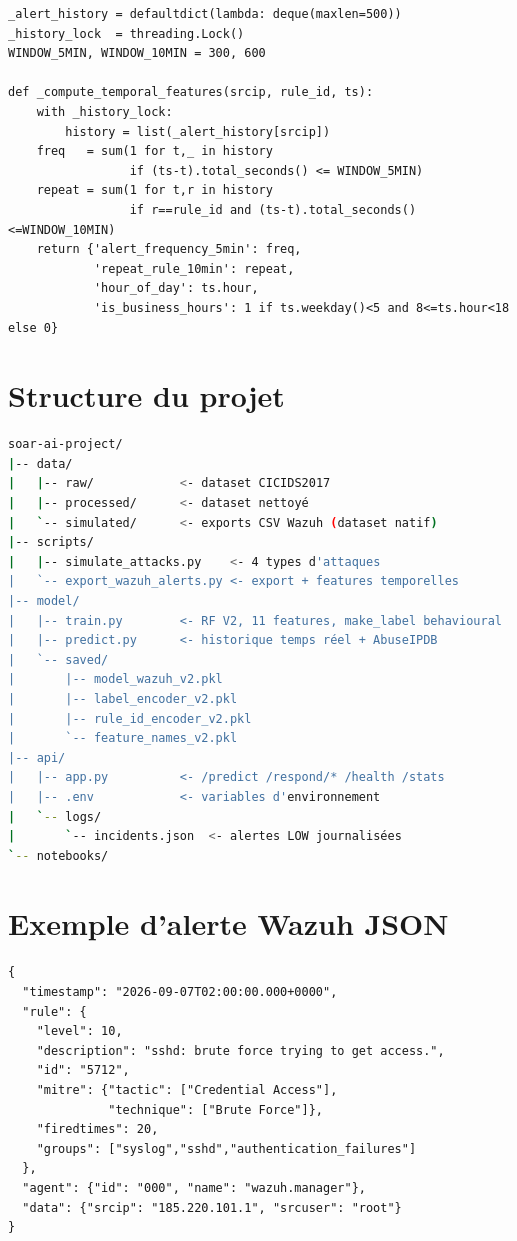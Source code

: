 \documentclass[12pt,a4paper]{report}
\begin{document}
\begin{lstlisting}[style=mycode,
  caption={Historique en mémoire thread-safe (predict.py)}]
_alert_history = defaultdict(lambda: deque(maxlen=500))
_history_lock  = threading.Lock()
WINDOW_5MIN, WINDOW_10MIN = 300, 600

def _compute_temporal_features(srcip, rule_id, ts):
    with _history_lock:
        history = list(_alert_history[srcip])
    freq   = sum(1 for t,_ in history
                 if (ts-t).total_seconds() <= WINDOW_5MIN)
    repeat = sum(1 for t,r in history
                 if r==rule_id and (ts-t).total_seconds()<=WINDOW_10MIN)
    return {'alert_frequency_5min': freq,
            'repeat_rule_10min': repeat,
            'hour_of_day': ts.hour,
            'is_business_hours': 1 if ts.weekday()<5 and 8<=ts.hour<18 else 0}
\end{lstlisting}

\chapter{Structure du projet}
\label{annexe:structure}

\begin{lstlisting}[style=mycode, language=bash,
  caption={Structure du répertoire soar-ai-project}]
soar-ai-project/
|-- data/
|   |-- raw/            <- dataset CICIDS2017
|   |-- processed/      <- dataset nettoyé
|   `-- simulated/      <- exports CSV Wazuh (dataset natif)
|-- scripts/
|   |-- simulate_attacks.py    <- 4 types d'attaques
|   `-- export_wazuh_alerts.py <- export + features temporelles
|-- model/
|   |-- train.py        <- RF V2, 11 features, make_label behavioural
|   |-- predict.py      <- historique temps réel + AbuseIPDB
|   `-- saved/
|       |-- model_wazuh_v2.pkl
|       |-- label_encoder_v2.pkl
|       |-- rule_id_encoder_v2.pkl
|       `-- feature_names_v2.pkl
|-- api/
|   |-- app.py          <- /predict /respond/* /health /stats
|   |-- .env            <- variables d'environnement
|   `-- logs/
|       `-- incidents.json  <- alertes LOW journalisées
`-- notebooks/
\end{lstlisting}

\chapter{Exemple d'alerte Wazuh JSON}
\label{annexe:alerte}

\begin{lstlisting}[style=mycode,
  caption={Alerte Wazuh — brute force SSH (rule 5712, level 10)}]
{
  "timestamp": "2026-09-07T02:00:00.000+0000",
  "rule": {
    "level": 10,
    "description": "sshd: brute force trying to get access.",
    "id": "5712",
    "mitre": {"tactic": ["Credential Access"],
              "technique": ["Brute Force"]},
    "firedtimes": 20,
    "groups": ["syslog","sshd","authentication_failures"]
  },
  "agent": {"id": "000", "name": "wazuh.manager"},
  "data": {"srcip": "185.220.101.1", "srcuser": "root"}
}
\end{lstlisting}
\end{document}

